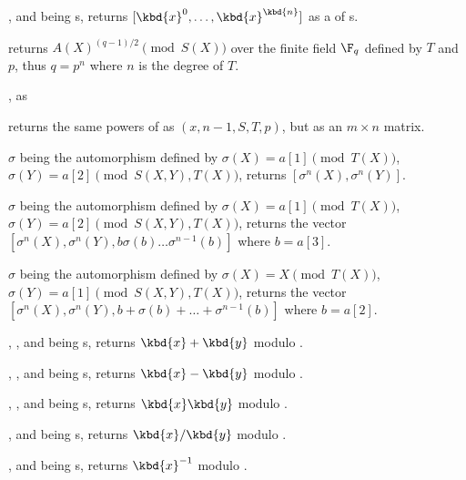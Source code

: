 ,  and
 being s, returns $[\kbd{x}^0, \dots, \kbd{x}^\kbd{n}]$ as a
 of s.

 returns
$A(X)^{(q-1)/2}\pmod{S(X)}$ over the finite field $\F_q$ defined by $T$
and $p$, thus $q=p^n$ where $n$ is the degree of $T$.

, as

returns the same powers of  as $(x, n-1,S, T, p)$,
but as an $m\times n$ matrix.

$\sigma$ being the automorphism defined by $\sigma(X)=a[1]\pmod{T(X)}$,
$\sigma(Y)=a[2]\pmod{S(X,Y),T(X)}$, returns $[\sigma^n(X),\sigma^n(Y)]$.

$\sigma$ being the automorphism defined by $\sigma(X)=a[1]\pmod{T(X)}$,
$\sigma(Y)=a[2]\pmod{S(X,Y),T(X)}$, returns the vector
$[\sigma^n(X),\sigma^n(Y),b\sigma(b)\ldots\sigma^{n-1}(b)]$
where $b=a[3]$.

$\sigma$ being the automorphism defined by $\sigma(X)=X\pmod{T(X)}$,
$\sigma(Y)=a[1]\pmod{S(X,Y),T(X)}$, returns the vector
$[\sigma^n(X),\sigma^n(Y),b+\sigma(b)+\ldots+\sigma^{n-1}(b)]$
where $b=a[2]$.


, ,  and
 being s, returns $\kbd{x} + \kbd{y}$ modulo .

, ,  and
 being s, returns $\kbd{x} - \kbd{y}$ modulo .

, ,  and
 being s, returns $\kbd{x}\*\kbd{y}$ modulo .

,  and
 being s, returns $\kbd{x}/\kbd{y}$ modulo .

,  and
 being s, returns $\kbd{x}^{-1}$ modulo .

